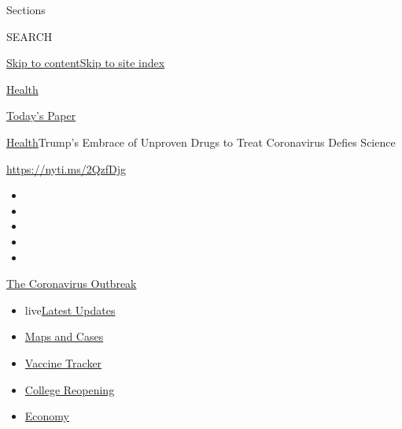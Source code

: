 Sections

SEARCH

\protect\hyperlink{site-content}{Skip to
content}\protect\hyperlink{site-index}{Skip to site index}

\href{https://www.nytimes.com/section/health}{Health}

\href{https://myaccount.nytimes.com/auth/login?response_type=cookie\&client_id=vi}{}

\href{https://www.nytimes.com/section/todayspaper}{Today's Paper}

\href{/section/health}{Health}\textbar{}Trump's Embrace of Unproven
Drugs to Treat Coronavirus Defies Science

\url{https://nyti.ms/2QzfDjg}

\begin{itemize}
\item
\item
\item
\item
\item
\end{itemize}

\href{https://www.nytimes.com/news-event/coronavirus?action=click\&pgtype=Article\&state=default\&region=TOP_BANNER\&context=storylines_menu}{The
Coronavirus Outbreak}

\begin{itemize}
\tightlist
\item
  live\href{https://www.nytimes.com/2020/08/04/world/coronavirus-cases.html?action=click\&pgtype=Article\&state=default\&region=TOP_BANNER\&context=storylines_menu}{Latest
  Updates}
\item
  \href{https://www.nytimes.com/interactive/2020/us/coronavirus-us-cases.html?action=click\&pgtype=Article\&state=default\&region=TOP_BANNER\&context=storylines_menu}{Maps
  and Cases}
\item
  \href{https://www.nytimes.com/interactive/2020/science/coronavirus-vaccine-tracker.html?action=click\&pgtype=Article\&state=default\&region=TOP_BANNER\&context=storylines_menu}{Vaccine
  Tracker}
\item
  \href{https://www.nytimes.com/2020/08/02/us/covid-college-reopening.html?action=click\&pgtype=Article\&state=default\&region=TOP_BANNER\&context=storylines_menu}{College
  Reopening}
\item
  \href{https://www.nytimes.com/live/2020/08/04/business/stock-market-today-coronavirus?action=click\&pgtype=Article\&state=default\&region=TOP_BANNER\&context=storylines_menu}{Economy}
\end{itemize}

